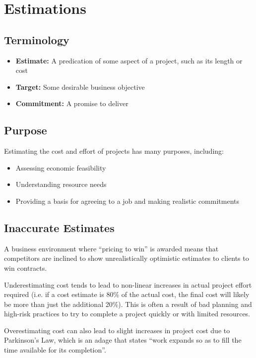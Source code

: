 \documentclass[12pt,titlepage]{article}
\let\stdsection\section
\renewcommand\section{\clearpage\stdsection}
\begin{document}
  \section{Estimations}

    \subsection{Terminology}
      \begin{itemize}
        \item \textbf{Estimate:} A predication of some aspect of a project, such as its length or cost
        \item \textbf{Target:} Some desirable business objective
        \item \textbf{Commitment:} A promise to deliver
      \end{itemize}

    \subsection{Purpose}
      Estimating the cost and effort of projects has many purposes, including:
      \begin{itemize}
        \item Assessing economic feasibility
        \item Understanding resource needs
        \item Providing a basis for agreeing to a job and making realistic commitments
      \end{itemize}

    \subsection{Inaccurate Estimates}
      A business environment where ``pricing to win'' is awarded means that competitors are inclined to show unrealistically optimistic estimates to clients
      to win contracts.

      Underestimating cost tends to lead to non-linear increases in actual project effort required (i.e. if a cost estimate is 80\% of the actual cost, the
      final cost will likely be more than just the additional 20\%). This is often a result of bad planning and high-risk practices to try to complete a project
      quickly or with limited resources.

      Overestimating cost can also lead to slight increases in project cost due to Parkinson's Law, which is an adage that states ``work expands so as to fill
      the time available for its completion''.
\end{document}
